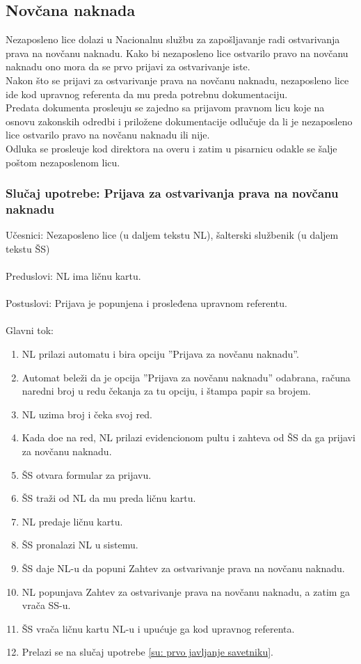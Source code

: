 \subsection{Nov\v cana naknada}

Nezaposleno lice dolazi u Nacionalnu slu\v zbu za zapo\v sljavanje radi ostvarivanja prava na nov\v canu naknadu. Kako bi nezaposleno lice ostvarilo pravo na nov\v canu naknadu ono mora da se prvo prijavi za ostvarivanje iste.
\\
Nakon \v sto se prijavi za ostvarivanje prava na nov\v canu naknadu, nezaposleno lice ide kod upravnog referenta da mu preda potrebnu dokumentaciju.
\\ Predata dokumenta prosle\dj uju se zajedno sa prijavom pravnom licu koje na osnovu zakonskih odredbi i priložene dokumentacije odlu\v cuje da li je nezaposleno lice ostvarilo pravo na nov\v canu naknadu ili nije.
\\
Odluka se prosle\dj uje kod direktora na overu i zatim u pisarnicu odakle se \v salje po\v stom nezaposlenom licu.

\subsubsection{Slu\v caj upotrebe: Prijava za ostvarivanja prava na nov\v canu naknadu}

\noindent Učesnici: Nezaposleno lice (u daljem tekstu NL), šalterski službenik (u daljem tekstu ŠS)
\\
\\ Preduslovi: NL ima ličnu kartu.
\\
\\ Postuslovi: Prijava je popunjena i prosleđena upravnom referentu.
\\
\\ Glavni tok:
\begin{enumerate}
\item NL prilazi automatu i bira opciju ''Prijava za novčanu naknadu''.
\item Automat bele\v zi da je opcija ''Prijava za novčanu naknadu'' odabrana, ra\v cuna naredni broj u redu \v cekanja za tu opciju, i \v stampa papir sa brojem.
\item NL uzima broj i \v ceka svoj red.
	\item Kada do\dj e na red, NL prilazi evidencionom pultu i zahteva od \v SS da ga prijavi za novčanu naknadu.
	\item \v SS otvara formular za prijavu.
	\item \v SS tra\v zi od NL da mu preda li\v cnu kartu.
	\item NL predaje li\v cnu kartu.
    \item \v SS pronalazi NL u sistemu.
	\item \v SS daje NL-u da popuni Zahtev za ostvarivanje prava na novčanu naknadu.
	\item NL popunjava Zahtev za ostvarivanje prava na novčanu naknadu, a zatim ga vra\v ca SS-u.
	\item \v SS vra\v ca ličnu kartu NL-u i upućuje ga kod upravnog referenta.
	\item Prelazi se na slu\v caj upotrebe \ref{su: prvo javljanje savetniku}.
\end{enumerate}

